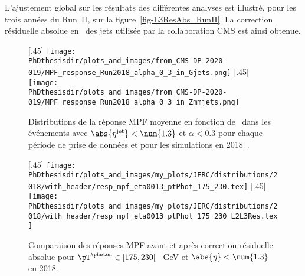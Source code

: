 \par L'ajustement global sur les résultats des différentes analyses est illustré, pour les trois années du Run~II, sur la figure~\ref{fig-L3ResAbs_RunII}.
La correction résiduelle absolue en \pT\ des jets utilisée par la collaboration CMS est ainsi obtenue.
\begin{figure}[p]
\centering
{}[.45\textwidth]
{\texttt{[image: \\PhDthesisdir/plots\_and\_images/from\_CMS-DP-2020-019/MPF\_response\_Run2018\_alpha\_0\_3\_in\_Gjets.png]}}
\hfill
{}[.45\textwidth]
{\texttt{[image: \\PhDthesisdir/plots\_and\_images/from\_CMS-DP-2020-019/MPF\_response\_Run2018\_alpha\_0\_3\_in\_Zmmjets.png]}}
\caption[Distributions de la réponse MPF moyenne en fonction de \pT\ en 2018.]{Distributions de la réponse MPF moyenne en fonction de \pT\ dans les événements avec $\abs{\eta^\text{jet}}<\num{1.3}$ et $\alpha<\num{0.3}$ pour chaque période de prise de données et pour les simulations en 2018~\cite{CMS-DP-2020-019}.}
\label{fig-chapter-JERC-section-JES-subsec-results-response_eta0013_alpha_0_3_2018}
\end{figure}

\begin{figure}[p]
\centering
{}[.45\textwidth]
{\texttt{[image: \\PhDthesisdir/plots\_and\_images/my\_plots/JERC/distributions/2018/with\_header/resp\_mpf\_eta0013\_ptPhot\_175\_230.tex]}}
\hfill
{}[.45\textwidth]
{\texttt{[image: \\PhDthesisdir/plots\_and\_images/my\_plots/JERC/distributions/2018/with\_header/resp\_mpf\_eta0013\_ptPhot\_175\_230\_L2L3Res.tex]}}
\caption[Comparaison des réponses MPF avant et après correction résiduelle absolue en 2018.]{Comparaison des réponses MPF avant et après correction résiduelle absolue  pour $\pT^{\photon}\in[175, 230[$ \SI{}{\GeV} et $\abs{\eta}<\num{1.3}$ en 2018.}
\label{fig-distribs_Gjets_18_resp_mpf_L2L3Res_cross_check}
\end{figure}
